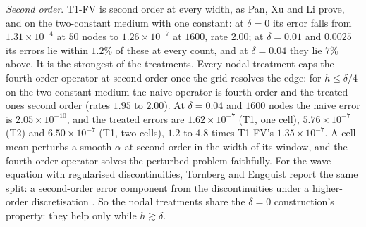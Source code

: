 \documentclass[11pt]{amsart}
\theoremstyle{definition}
\theoremstyle{remark}
\newcommand{\para}[1]{\par\smallskip\noindent\textit{#1}.\enspace}
\newcommand{\sci}[2]{#1 \times 10^{#2}}
\begin{document}
\para{Second order}
T1-FV is second order at every width, as Pan, Xu and Li prove, and on the
two-constant medium with one constant: at $\delta = 0$ its error falls from $\sci{1.31}{-4}$ at $50$
nodes to $\sci{1.26}{-7}$ at $1600$, rate $2.00$; at $\delta = 0.01$ and
$0.0025$ its errors lie within $1.2\%$ of these at every count, and at
$\delta = 0.04$ they lie $7\%$ above. It is the strongest of the
treatments. Every nodal treatment caps the fourth-order operator at second
order once the grid resolves the edge: for $h \le \delta/4$ on the
two-constant medium the naive operator is fourth order and the treated ones
second order (rates $1.95$ to $2.00$). At $\delta = 0.04$ and $1600$ nodes the naive error is
$\sci{2.05}{-10}$, and the treated errors are $\sci{1.62}{-7}$ (T1, one
cell), $\sci{5.76}{-7}$ (T2) and $\sci{6.50}{-7}$ (T1, two cells), $1.2$ to
$4.8$ times T1-FV's $\sci{1.35}{-7}$. A cell mean perturbs a smooth $\alpha$
at second order in the width of its window, and the fourth-order operator
solves the perturbed problem faithfully. For the wave equation with
regularised discontinuities, Tornberg and Engquist report the same split: a
second-order error component from the discontinuities under a higher-order
discretisation \cite{TornbergEngquist2006}. So the nodal treatments share the
$\delta = 0$ construction's property: they help only while $h \gtrsim \delta$.
\end{document}
